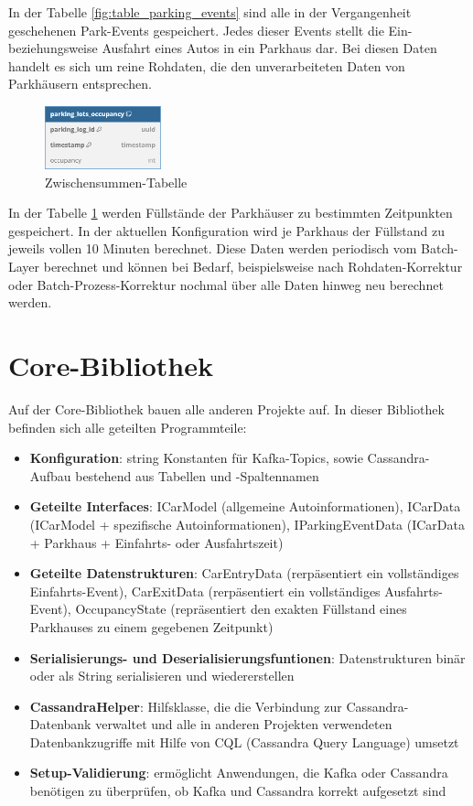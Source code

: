 In der Tabelle \ref{fig:table_parking_events} sind alle in der Vergangenheit geschehenen Park-Events gespeichert.
Jedes dieser Events stellt die Ein- beziehungsweise Ausfahrt eines Autos in ein Parkhaus dar.
Bei diesen Daten handelt es sich um reine Rohdaten, die den unverarbeiteten Daten von Parkhäusern entsprechen.

\begin{figure}[h!]%
    \centering%
    \includegraphics[width=0.3\textwidth]{Graphics/occupancy.png}%
    \caption{Zwischensummen-Tabelle}%
    \label{fig:table_occupancy}
\end{figure}%

In der Tabelle \ref{fig:table_occupancy} werden Füllstände der Parkhäuser zu bestimmten Zeitpunkten gespeichert.
In der aktuellen Konfiguration wird je Parkhaus der Füllstand zu jeweils vollen 10 Minuten berechnet.
Diese Daten werden periodisch vom Batch-Layer berechnet und können bei Bedarf, beispielsweise nach Rohdaten-Korrektur oder Batch-Prozess-Korrektur nochmal über alle Daten hinweg neu berechnet werden.

\section{Core-Bibliothek}
Auf der Core-Bibliothek bauen alle anderen Projekte auf.
In dieser Bibliothek befinden sich alle geteilten Programmteile:
\begin{itemize}
    \item \textbf{Konfiguration}: string Konstanten für Kafka-Topics, sowie Cassandra-Aufbau bestehend aus Tabellen und -Spaltennamen
    \item \textbf{Geteilte Interfaces}: ICarModel (allgemeine Autoinformationen), ICarData (ICarModel + spezifische Autoinformationen), IParkingEventData (ICarData + Parkhaus + Einfahrts- oder Ausfahrtszeit)
    \item \textbf{Geteilte Datenstrukturen}: CarEntryData (rerpäsentiert ein vollständiges Einfahrts-Event), CarExitData (rerpäsentiert ein vollständiges Ausfahrts-Event), OccupancyState (repräsentiert den exakten Füllstand eines Parkhauses zu einem gegebenen Zeitpunkt)
    \item \textbf{Serialisierungs- und Deserialisierungsfuntionen}: Datenstrukturen binär oder als String serialisieren und wiedererstellen
    \item \textbf{CassandraHelper}: Hilfsklasse, die die Verbindung zur Cassandra-Datenbank verwaltet und alle in anderen Projekten verwendeten Datenbankzugriffe mit Hilfe von CQL (Cassandra Query Language) umsetzt
    \item \textbf{Setup-Validierung}: ermöglicht Anwendungen, die Kafka oder Cassandra benötigen zu überprüfen, ob Kafka und Cassandra korrekt aufgesetzt sind
\end{itemize}


